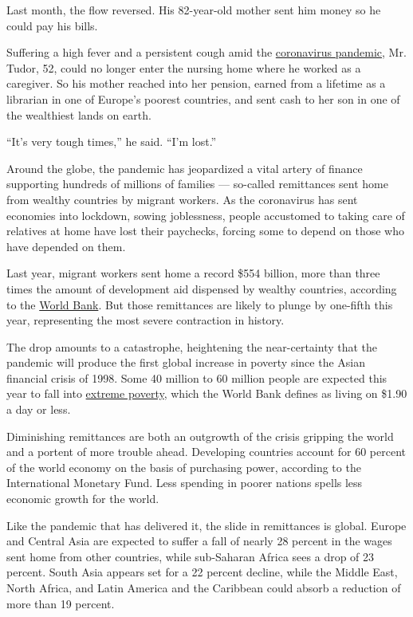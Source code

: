Last month, the flow reversed. His 82-year-old mother sent him money so
he could pay his bills.

Suffering a high fever and a persistent cough amid the
\href{https://www.nytimes3xbfgragh.onion/2020/07/28/us/politics/coronavirus-hunger-poverty.html}{coronavirus
pandemic}, Mr. Tudor, 52, could no longer enter the nursing home where
he worked as a caregiver. So his mother reached into her pension, earned
from a lifetime as a librarian in one of Europe's poorest countries, and
sent cash to her son in one of the wealthiest lands on earth.

``It's very tough times,'' he said. ``I'm lost.''

Around the globe, the pandemic has jeopardized a vital artery of finance
supporting hundreds of millions of families --- so-called remittances
sent home from wealthy countries by migrant workers. As the coronavirus
has sent economies into lockdown, sowing joblessness, people accustomed
to taking care of relatives at home have lost their paychecks, forcing
some to depend on those who have depended on them.

Last year, migrant workers sent home a record \$554 billion, more than
three times the amount of development aid dispensed by wealthy
countries, according to the
\href{https://www.worldbank.org/en/news/press-release/2020/04/22/world-bank-predicts-sharpest-decline-of-remittances-in-recent-history}{World
Bank}. But those remittances are likely to plunge by one-fifth this
year, representing the most severe contraction in history.

The drop amounts to a catastrophe, heightening the near-certainty that
the pandemic will produce the first global increase in poverty since the
Asian financial crisis of 1998. Some 40 million to 60 million people are
expected this year to fall into
\href{https://www.worldbank.org/en/topic/poverty/overview}{extreme
poverty}, which the World Bank defines as living on \$1.90 a day or
less.

Diminishing remittances are both an outgrowth of the crisis gripping the
world and a portent of more trouble ahead. Developing countries account
for 60 percent of the world economy on the basis of purchasing power,
according to the International Monetary Fund. Less spending in poorer
nations spells less economic growth for the world.

Like the pandemic that has delivered it, the slide in remittances is
global. Europe and Central Asia are expected to suffer a fall of nearly
28 percent in the wages sent home from other countries, while
sub-Saharan Africa sees a drop of 23 percent. South Asia appears set for
a 22 percent decline, while the Middle East, North Africa, and Latin
America and the Caribbean could absorb a reduction of more than 19
percent.


